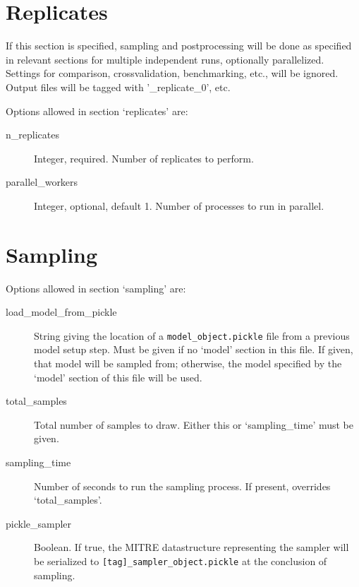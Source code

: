 \documentclass[12pt]{report}
\begin{document}
\section{Replicates}\label{replicates}
If this section is specified, sampling and postprocessing will be done
as specified in relevant sections for multiple independent runs,
optionally parallelized. Settings for comparison, crossvalidation,
benchmarking, etc., will be ignored. Output files will be tagged with
'\_replicate\_0', etc.

Options allowed in section `replicates' are:
\begin{description}
\item[n\_replicates] Integer, required. Number of replicates to perform.
\item[parallel\_workers] Integer, optional, default 1. Number of
  processes to run in parallel.
\end{description}


\section{Sampling}\label{sampling}
Options allowed in section `sampling' are:
\begin{description}
\item[load\_model\_from\_pickle] String giving the location of a
  \texttt{model\_object.pickle} file from a previous model setup
  step. Must be given if no `model' section in this file. If given,
  that model will be sampled from; otherwise, the model specified by
  the `model' section of this file will be used.
\item[total\_samples] Total number of samples to draw. Either this or
  `sampling\_time' must be given.
\item[sampling\_time] Number of seconds to run the sampling process. If present,
  overrides `total\_samples'.
\item[pickle\_sampler] Boolean. If true, the MITRE datastructure
  representing the sampler will be serialized to
  \texttt{[tag]\_sampler\_object.pickle} at the conclusion of
  sampling.
\end{description}
\end{document}
